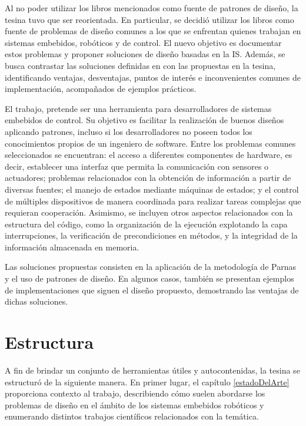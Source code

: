 Al no poder utilizar los libros mencionados como fuente de patrones de diseño, la tesina tuvo que ser reorientada. En particular, se decidió utilizar los libros como fuente de problemas de diseño comunes a los que se enfrentan quienes trabajan en sistemas embebidos, robóticos y de control. El nuevo objetivo es documentar estos problemas y proponer soluciones de diseño basadas en la IS. Además, se busca contrastar las soluciones definidas en \cite{douglass} con las propuestas en la tesina, identificando ventajas, desventajas, puntos de interés e inconvenientes comunes de implementación, acompañados de ejemplos prácticos.

El trabajo, pretende ser una herramienta para desarrolladores de sistemas embebidos de control. Su objetivo es facilitar la realización de buenos diseños aplicando patrones, incluso si los desarrolladores no poseen todos los conocimientos propios de un ingeniero de software. Entre los problemas comunes seleccionados se encuentran: el acceso a diferentes componentes de hardware, es decir, establecer una interfaz que permita la comunicación con sensores o actuadores; problemas relacionados con la obtención de información a partir de diversas fuentes; el manejo de estados mediante máquinas de estados; y el control de múltiples dispositivos de manera coordinada para realizar tareas complejas que requieran cooperación. Asimismo, se incluyen otros aspectos relacionados con la estructura del código, como la organización de la ejecución explotando la capa interrupciones, la verificación de precondiciones en métodos, y la integridad de la información almacenada en memoria.

Las soluciones propuestas consisten en la aplicación de la metodología de Parnas \cite{parnas72} y el uso de patrones de diseño. En algunos casos, también se presentan ejemplos de implementaciones que siguen el diseño propuesto, demostrando las ventajas de dichas soluciones.

\section*{Estructura}

A fin de brindar un conjunto de herramientas útiles y autocontenidas, la tesina se estructuró de la siguiente manera. En primer lugar, el capítulo \ref{estadoDelArte} proporciona contexto al trabajo, describiendo cómo suelen abordarse los problemas de diseño en el ámbito de los sistemas embebidos robóticos y enumerando distintos trabajos científicos relacionados con la temática.


